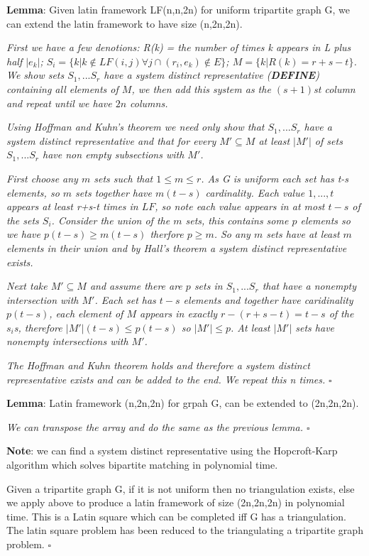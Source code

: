 \documentclass[a4paper,11pt]{report}
\newcounter{col}
\begin{document}
\textbf{Lemma}: Given latin framework LF(n,n,2n) for uniform tripartite graph G, we can extend the latin framework to have size
(n,2n,2n).

\textit{First we have a few denotions: R(k) = the number of times k appears in L plus half $|e_k|$; $S_i=\{k|k \not\in LF(i,j) \forall j \cap (r_i,e_k)\not\in E\}$; $M=\{k|R(k)=r+s-t\}$. We show sets $S_1,...S_r$ have a system distinct representative (\textbf{DEFINE}) containing all elements of $M$, we then add this system as the $(s+1)$st column and repeat until we have $2n$ columns.}

\textit{Using Hoffman and Kuhn's theorem \cite{hoffman} we need only show that $S_1,...S_r$ have a system distinct representative and that for every $M'\subseteq M$ at least $|M'|$ of sets $S_1,...S_r$ have non empty subsections with $M'$.}

\textit{First choose any $m$ sets such that $1\leq m \leq r$. As G is uniform each set has t-s elements, so $m$ sets together have $m(t-s)$ cardinality. Each value $1,...,t$ appears at least r+s-t times in $LF$, so note each value appears in at most $t-s$ of the sets $S_i$. Consider the union of the $m$ sets, this contains some $p$ elements so we have $p(t-s)\geq m(t-s)$ therfore $p\geq m$. So any $m$ sets have at least $m$ elements in their union and by Hall's theorem \cite{hall} a system distinct representative exists.}

\textit{Next take $M'\subseteq M$ and assume there are $p$ sets in $S_1,...S_r$ that have a nonempty intersection with $M'$. Each set has $t-s$ elements and together have caridinality $p(t-s)$, each element of $M$ appears in exactly $r-(r+s-t)=t-s$ of the $s_i$s, therefore $|M'|(t-s)\leq p(t-s)$ so $|M'|\leq p$. At least $|M'|$ sets have nonempty intersections with $M'$.}

\textit{The Hoffman and Kuhn theorem holds and therefore a system distinct representative exists and can be added to the end. We repeat this n times.} $\square$

\textbf{Lemma}: Latin framework (n,2n,2n) for grpah G, can be extended to (2n,2n,2n).

\textit{We can transpose the array and do the same as the previous lemma. $\square$}

\textbf{Note}: we can find a system distinct representative using the Hopcroft-Karp \cite{hopcroft} algorithm which solves bipartite matching in polynomial time. 

Given a tripartite graph G, if it is not uniform then no triangulation exists, else we apply above to produce a latin framework of size (2n,2n,2n) in polynomial time. This is a Latin square which can be completed iff G has a triangulation. The latin square problem has been reduced to the triangulating a tripartite graph problem. $\square$
\end{document}

